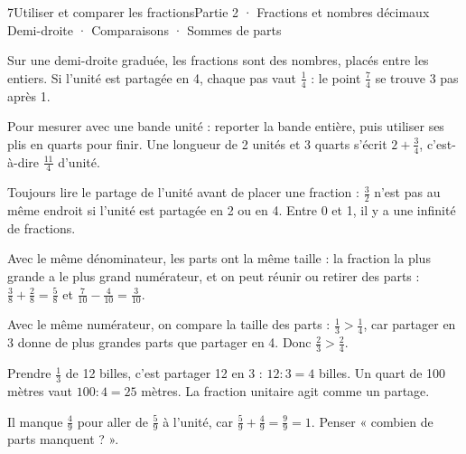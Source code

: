 \begin{ouverture}[calcul]{7}{Utiliser et comparer les fractions}{Partie 2 · Fractions et nombres décimaux}
{Demi-droite · Comparaisons · Sommes de parts}
\end{ouverture}
\pagestyle{otMain}\essentiel\fontsize{11}{15}\selectfont
{}\label{cours-7-1}
\begin{propriete}Sur une demi-droite graduée, les fractions sont des nombres, placés entre les entiers. Si l’unité est partagée en 4, chaque pas vaut $\frac14$ : le point $\frac74$ se trouve 3 pas après 1.\end{propriete}
\label{fig-cours-7-1-cours-droite-fractions}

\begin{savoirfaire}Pour mesurer avec une bande unité : reporter la bande entière, puis utiliser ses plis en quarts pour finir. Une longueur de 2 unités et 3 quarts s’écrit $2+\frac34$, c’est-à-dire $\frac{11}4$ d’unité.\end{savoirfaire}
\begin{attention}Toujours lire le partage de l’unité avant de placer une fraction : $\frac32$ n’est pas au même endroit si l’unité est partagée en 2 ou en 4. Entre 0 et 1, il y a une infinité de fractions.\end{attention}
\clearpage
{}\label{cours-7-2}
\begin{propriete}Avec le même dénominateur, les parts ont la même taille : la fraction la plus grande a le plus grand numérateur, et on peut réunir ou retirer des parts : $\frac38+\frac28=\frac58$ et $\frac7{10}-\frac4{10}=\frac3{10}$.\end{propriete}
\begin{exemple}Avec le même numérateur, on compare la taille des parts : $\frac13>\frac14$, car partager en 3 donne de plus grandes parts que partager en 4. Donc $\frac23>\frac24$.\end{exemple}
\begin{savoirfaire}Prendre $\frac13$ de 12 billes, c’est partager 12 en 3 : $12:3=4$ billes. Un quart de 100 mètres vaut $100:4=25$ mètres. La fraction unitaire agit comme un partage.\end{savoirfaire}
\begin{savoirfaire}Il manque $\frac49$ pour aller de $\frac59$ à l’unité, car $\frac59+\frac49=\frac99=1$. Penser « combien de parts manquent ? ».\end{savoirfaire}

